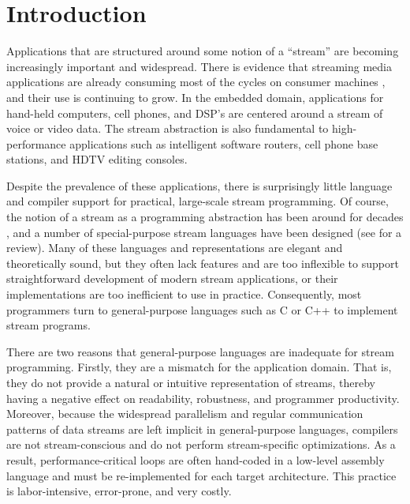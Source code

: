 \section{Introduction}

Applications that are structured around some notion of a ``stream''
are becoming increasingly important and widespread.  There is evidence
that streaming media applications are already consuming most of the
cycles on consumer machines \cite{Rix98}, and their use is continuing
to grow.  In the embedded domain, applications for hand-held
computers, cell phones, and DSP's are centered around a stream of
voice or video data.  The stream abstraction is also fundamental to
high-performance applications such as intelligent software routers,
cell phone base stations, and HDTV editing consoles.

Despite the prevalence of these applications, there is surprisingly
little language and compiler support for practical, large-scale stream
programming.  Of course, the notion of a stream as a programming
abstraction has been around for decades \cite{SICP}, and a number of
special-purpose stream languages have been designed (see
\cite{survey97} for a review).  Many of these languages and
representations are elegant and theoretically sound, but they often
lack features and are too inflexible to support straightforward
development of modern stream applications, or their implementations
are too inefficient to use in practice.  Consequently, most
programmers turn to general-purpose languages such as C or C++ to
implement stream programs.

There are two reasons that general-purpose languages are inadequate for
stream programming.  Firstly, they are a mismatch for the application
domain.  That is, they do not provide a natural or intuitive
representation of streams, thereby having a negative effect on
readability, robustness, and programmer productivity.  Moreover, because
the widespread parallelism and regular communication patterns of data
streams are left implicit in general-purpose languages, compilers are
not stream-conscious and do not perform stream-specific optimizations.
As a result, performance-critical loops are often hand-coded in a
low-level assembly language and must be re-implemented for each target
architecture.  This practice is labor-intensive, error-prone, and very
costly.

